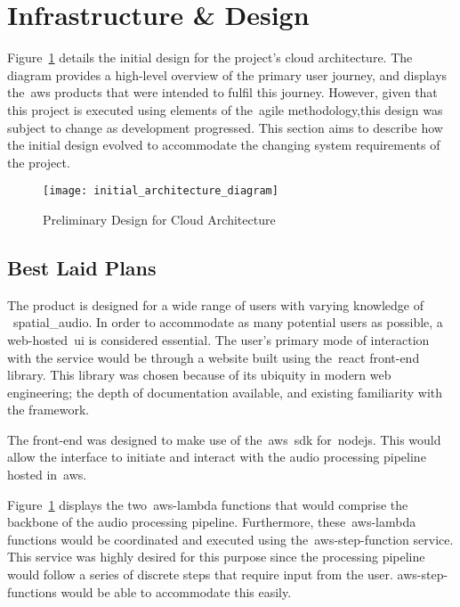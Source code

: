 \thispagestyle{plain}
\newpage
\section{Infrastructure \& Design}\label{sec:infrastructure-design}

\normalsize

Figure~\ref{fig:preliminary-design} details the initial design for the project's cloud architecture.
The diagram provides a high-level overview of the primary user journey,
and displays the~\gls{aws} products that were intended to fulfil this journey.
However, given that this project is executed using elements of the~\gls{agile} methodology,this design was subject to change as development progressed.
This section aims to describe how the initial design evolved to accommodate the changing system requirements of the project.

\begin{figure}[!htb]
    \minipage{\textwidth}
    \texttt{[image: initial\_architecture\_diagram]}
    \caption{Preliminary Design for Cloud Architecture}\label{fig:preliminary-design}
    \endminipage\hfill
\end{figure}

\subsection{Best Laid Plans}\label{subsec:best-laid-plans}

The product is designed for a wide range of users with varying knowledge of ~\gls{spatial_audio}.
In order to accommodate as many potential users as possible, a web-hosted~\gls{ui} is considered essential.
The user's primary mode of interaction with the service would be through a website
built using the~\gls{react} front-end library.
This library was chosen because of its ubiquity in modern web engineering; the depth of documentation available,
and existing familiarity with the framework.

The front-end was designed to make use of the~\gls{aws}~\gls{sdk} for~\gls{nodejs}.
This would allow the interface to initiate and interact with the audio processing pipeline hosted in~\gls{aws}.

Figure~\ref{fig:preliminary-design} displays the two~\gls{aws-lambda} functions
that would comprise the backbone of the audio processing pipeline.
Furthermore,
these~\gls{aws-lambda} functions would be coordinated and executed using the~\gls{aws-step-function} service.
This service was highly desired for this purpose
since the processing pipeline would follow a series of discrete steps that require input from the user.
\glspl{aws-step-function} would be able to accommodate this easily.

